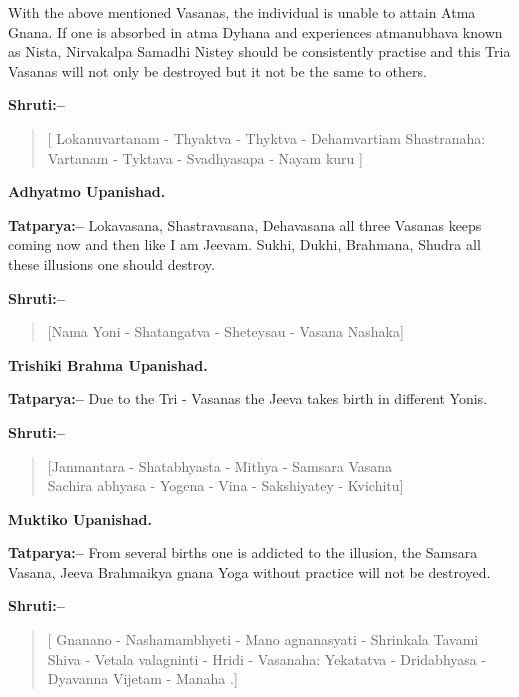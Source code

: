 With the above mentioned Vasanas, the individual is unable to attain Atma Gnana. If one is absorbed in atma Dyhana and experiences atmanubhava known as Nista, Nirvakalpa Samadhi Nistey should be consistently practise and this Tria Vasanas will not only be destroyed but it not be the same to others.

\textbf{Shruti:–}

\begin{verse}
[ Lokanuvartanam - Thyaktva - Thyktva - Deham\break vartiam  Shastranaha: Vartanam - Tyktava - Svadhya\break sapa - Nayam kuru ]
\end{verse}

\begin{flushright}
\textbf{Adhyatmo Upanishad.}
\end{flushright}

\textbf{Tatparya:–} Lokavasana, Shastravasana, Dehavasana all three Vasanas keeps coming now and then like I am Jeevam. Sukhi, Dukhi, Brahmana, Shudra all these illusions one should destroy.

\textbf{Shruti:–}

\begin{verse}
[Nama Yoni - Shatangatva - Sheteysau - Vasana Nashaka]
\end{verse}

\begin{flushright}
\textbf{Trishiki Brahma Upanishad.}
\end{flushright}

\textbf{Tatparya:–} Due to the Tri - Vasanas the Jeeva takes birth in different Yonis.

\textbf{Shruti:–}

\begin{verse}
[Janmantara - Shatabhyasta - Mithya - Samsara Vasana \\ Sachira abhyasa - Yogena - Vina - Sakshiyatey - Kvichitu]
\end{verse}

\begin{flushright}
\textbf{Muktiko Upanishad.}
\end{flushright}

\textbf{Tatparya:–} From several births one is addicted to the illusion, the Samsara Vasana, Jeeva Brahmaikya gnana Yoga without practice will not be destroyed.

\newpage

\textbf{Shruti:–}

\begin{verse}
[ Gnanano - Nashamambhyeti - Mano agnanasyati - Shrinkala  Tavami Shiva - Vetala valagninti - Hridi - Vasanaha: Yekatatva - Dridabhyasa - Dyavanna Vijetam - Manaha .]
\end{verse}

